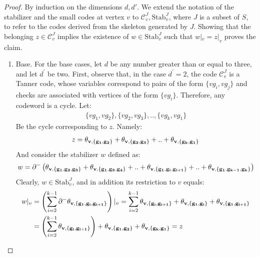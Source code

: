 \begin{proof}
  By induction on the dimensions $d, d'$. We extend the notation of the stabilizer and the small codes at vertex $v$ to $\mathcal{C}_{v}^{J}, \text{Stab}_{v}^{J}$, where $J$ is a subset of $S$, to refer to the codes derived from the skeleton generated by $J$. Showing that the belonging $z\in \mathcal{C}_{v}^{J}$ implies the existence of $w \in \text{Stab}_{v}^{J}$ such that $w|_{v} =z|_{v}$ proves the claim.
  \begin{enumerate}
    \item Base. For the base cases, let $d$ be any number greater than or equal to three, and let $d^{\prime}$ be two. First, observe that, in the case $d^{\prime}=2$, the code $\mathcal{C}_{v}^{J}$ is a Tanner code, whose variables correspond to pairs of the form $\{vg_{i}, vg_{j} \}$ and checks are associated with vertices of the form $\{vg_{i} \}$. Therefore, any codeword is a cycle. Let:
      \begin{equation*}
        \begin{split}
          \{vg_{1},vg_{2}\},\{vg_{2},vg_{3}\},..,\{vg_{k},vg_{1}\}
        \end{split}
      \end{equation*}
    Be the cycle corresponding to $z$. Namely:
      \begin{equation*}
        \begin{split}
          z = \mathbf{\theta_{v ,\{g_{1},g_{2}\}} } + \mathbf{\theta_{v ,\{g_{2},g_{3}\}} } + ..+ \mathbf{\theta_{v ,\{g_{k},g_{1}\}} }
        \end{split}
      \end{equation*}
    And consider the stabilizer $w$ defined as:
      \begin{equation*}
        \begin{split}
          w =  \partial^{-}\left(  \mathbf{\theta_{v ,\{g_{1},g_{2},g_{3}\}} } + \mathbf{\theta_{v ,\{g_{1},g_{3},g_{4}\}} } + .. +  \mathbf{\theta_{v ,\{g_{1},g_{i},g_{i+1}\}} } + .. + \mathbf{\theta_{v ,\{g_{1},g_{k-1},g_{k}\}} } \right)
        \end{split}
      \end{equation*}
    Clearly, $w \in \text{Stab}_{v}^{J}$, and in addition its restriction to $v$ equals:
      \begin{equation*}
        \begin{split}
          w|_{v} &=  \left( \sum_{i=2}^{k-1}\partial^{-}\mathbf{\theta_{v ,\{g_{1},g_{i},g_{i+1}\}} }  \right)|_{v} = \sum_{i=2}^{k-1} \mathbf{\theta_{v ,\{g_{i},g_{i+1}\}} }  + \mathbf{\theta_{v ,\{g_{1},g_{i}\}} }  + \mathbf{\theta_{v ,\{g_{1},g_{i+1}\}} } \\
          & = \left(\sum_{i=2}^{k-1} \mathbf{\theta_{v ,\{g_{i},g_{i+1}\}} } \right) + \mathbf{\theta_{v ,\{g_{1},g_{2}\}} }  + \mathbf{\theta_{v ,\{g_{k},g_{1}\}} } = z
        \end{split}
      \end{equation*}
      

\end{enumerate}
\end{proof}
